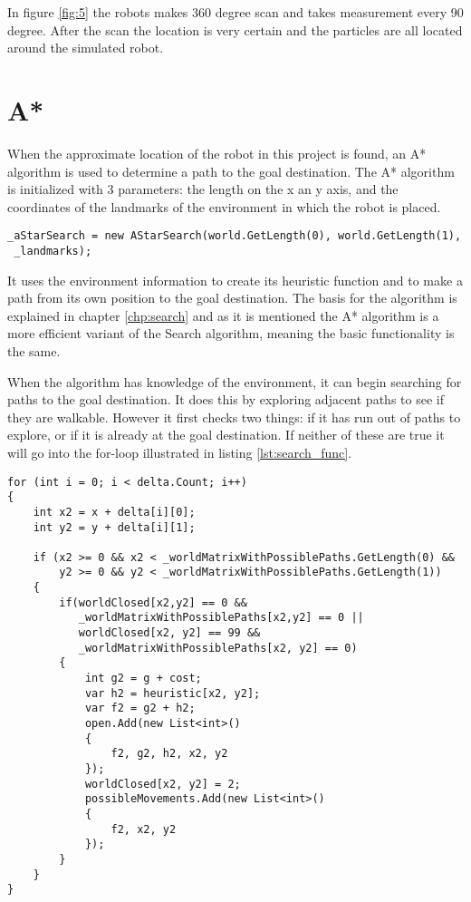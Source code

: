 
In figure \ref{fig:5} the robots makes 360 degree scan and takes measurement every 90 degree. After the scan the location is very certain and the particles are all located around the simulated robot.


\section{A*}
When the approximate location of the robot in this project is found, an A* algorithm is used to determine a path to the goal destination. The A* algorithm is initialized with 3 parameters: the length on the x an y axis, and the coordinates of the landmarks of the environment in which the robot is placed. 

\lstset{style=sharpc}
\begin{lstlisting}[caption={Initialization of the A* algorithm}, label=lst:Astar_init, mathescape=true]             
_aStarSearch = new AStarSearch(world.GetLength(0), world.GetLength(1),
 _landmarks);
\end{lstlisting}

It uses the environment information to create its heuristic function and to make a path from its own position to the goal destination. The basis for the algorithm is explained in chapter \ref{chp:search} and as it is mentioned the A* algorithm is a more efficient variant of the Search algorithm, meaning the basic functionality is the same. 

When the algorithm has knowledge of the environment, it can begin searching for paths to the goal destination. It does this by exploring adjacent paths to see if they are walkable. However it first checks two things: if it has run out of paths to explore, or if it is already at the goal destination. If neither of these are true it will go into the for-loop illustrated in listing \ref{lst:search_func}. 

\lstset{style=sharpc}
\begin{lstlisting}[caption={Functionality of Search}, label=lst:search_func, mathescape=true]             
for (int i = 0; i < delta.Count; i++)
{
	int x2 = x + delta[i][0];
	int y2 = y + delta[i][1];

	if (x2 >= 0 && x2 < _worldMatrixWithPossiblePaths.GetLength(0) && 
	    y2 >= 0 && y2 < _worldMatrixWithPossiblePaths.GetLength(1))
	{
		if(worldClosed[x2,y2] == 0 && 
		   _worldMatrixWithPossiblePaths[x2,y2] == 0 || 
		   worldClosed[x2, y2] == 99 && 
		   _worldMatrixWithPossiblePaths[x2, y2] == 0)
		{
			int g2 = g + cost;
			var h2 = heuristic[x2, y2];
			var f2 = g2 + h2;
			open.Add(new List<int>()
			{
				f2, g2, h2, x2, y2
			});
			worldClosed[x2, y2] = 2;
			possibleMovements.Add(new List<int>()
			{
				f2, x2, y2
			});
		}
	}
}
\end{lstlisting}

